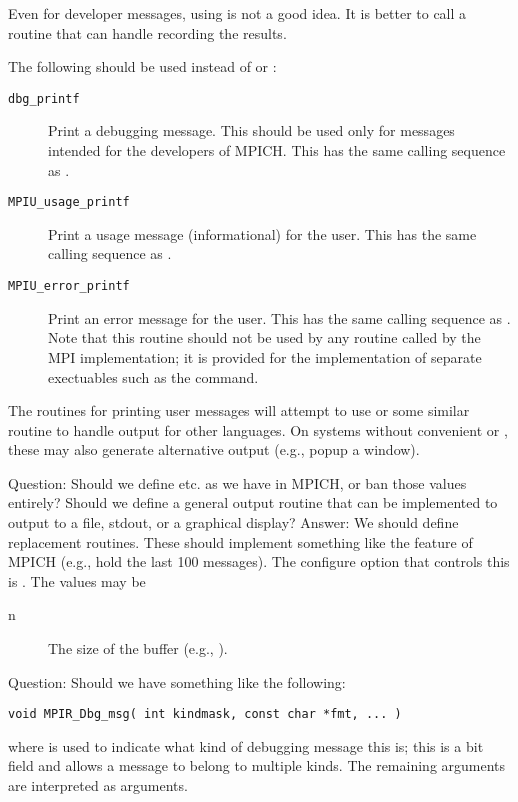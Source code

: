 \documentclass{article}
\begin{document}
Even for developer messages, using  is not a good idea.
It is better to call a routine that can handle recording the results.

The following should be used instead of  or :
\begin{description}
\item[\texttt{dbg_printf}]Print a debugging message.  This should be
  used only for messages intended for the developers of MPICH.  This
  has the same calling sequence as .
\item[\texttt{MPIU_usage_printf}]Print a usage message (informational) for
  the user.  This has the same calling sequence as .
\item[\texttt{MPIU_error_printf}]Print an error message for the user.  This
  has the same calling sequence as .  Note that this
  routine should not be used by any routine called by the MPI
  implementation; it is provided for the implementation of separate
  exectuables such as the  command.
\end{description}
The routines for printing user messages will attempt to use
 or some similar routine to handle output for other
languages.  On systems without convenient  or
, these may also generate alternative output (e.g., popup
a window).


Question: Should we define  etc. as we have in MPICH, or
ban those values entirely?  Should we define a general output routine
that can be implemented to output to a file, stdout, or a graphical display?
Answer: We should define replacement routines.  These should implement
something like the  feature of MPICH (e.g., hold the last 100
messages).  
The configure option that controls this is
.  The values may be
\begin{description}
\item[n]The size of the buffer (e.g., ).
\end{description}

Question:  Should we have something like the following:
\begin{verbatim}
void MPIR_Dbg_msg( int kindmask, const char *fmt, ... )
\end{verbatim}
where  is used to indicate what kind of debugging
message this is; this is a bit field and allows a message to belong to
multiple kinds.  The remaining arguments are interpreted as
 arguments.  
\end{document}
